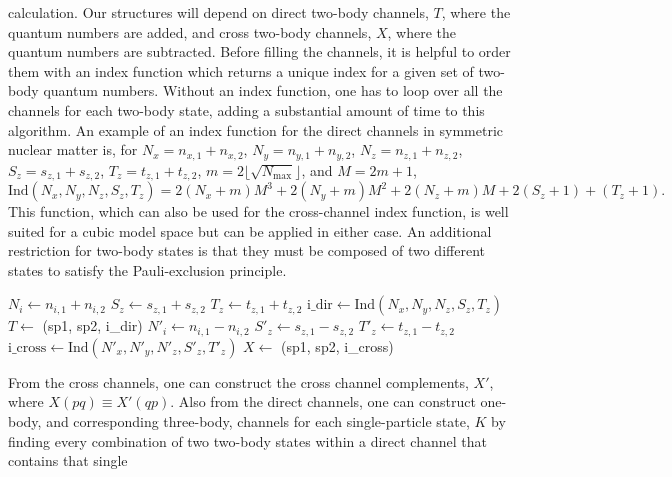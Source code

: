   calculation. Our structures will depend on direct two-body channels,
  $T$, where the quantum numbers are added, and cross two-body
  channels, $X$, where the quantum numbers are subtracted. Before
  filling the channels, it is helpful to order them with an index
  function which returns a unique index for a given set of two-body
  quantum numbers. Without an index function, one has to loop over all
  the channels for each two-body state, adding a substantial amount
  of time to this algorithm. An example of an index function for the
  direct channels in symmetric nuclear matter is, for
  $N_{x}=n_{x,1}+n_{x,2}$, $N_{y}=n_{y,1}+n_{y,2}$,
  $N_{z}=n_{z,1}+n_{z,2}$, $S_{z}=s_{z,1}+s_{z,2}$,
  $T_{z}=t_{z,1}+t_{z,2}$, $m=2\lfloor\sqrt{N_{\text{max}}}\rfloor$,
  and $M=2m+1$,
  \begin{equation}
  \text{Ind}\left( N_{x},N_{y},N_{z},S_{z},T_{z}\right)=2\left(
  N_{x}+m\right)M^{3}+2\left( N_{y}+m\right)M^{2}+2\left(
  N_{z}+m\right)M+2\left( S_{z}+1\right)+\left(T_{z}+1\right).
  \end{equation}
  This function, which can also be used for the cross-channel index
  function, is well suited for a cubic model space but can be applied
  in either case. An additional restriction for two-body states is
  that they must be composed of two different states to satisfy the
  Pauli-exclusion principle.
\begin{svgraybox}
  \begin{algorithmic}
     
     \State $N_{i}\gets n_{i,1}+n_{i,2}$ \State
    $S_{z}\gets s_{z,1}+s_{z,2}$ \State $T_{z}\gets t_{z,1}+t_{z,2}$
    \State
    $\text{i\_dir}\gets\text{Ind}\left(N_{x},N_{y},N_{z},S_{z},T_{z}\right)$
    \State $T\gets$ (sp1, sp2, i\_dir) \State $N'_{i}\gets
    n_{i,1}-n_{i,2}$ \State $S'_{z}\gets s_{z,1}-s_{z,2}$ \State
    $T'_{z}\gets t_{z,1}-t_{z,2}$ \State
    $\text{i\_cross}\gets\text{Ind}\left(N'_{x},N'_{y},N'_{z},S'_{z},T'_{z}\right)$
    \State $X\gets$ (sp1, sp2, i\_cross) \EndIf \EndFor \EndFor
  \end{algorithmic}
\end{svgraybox}
  From the cross channels, one can construct the cross channel
  complements, $X'$, where $X\left( pq\right)\equiv X'\left(
  qp\right)$. Also from the direct channels, one can construct
  one-body, and corresponding three-body, channels for each
  single-particle state, $K$ by finding every combination of two
  two-body states within a direct channel that contains that single
